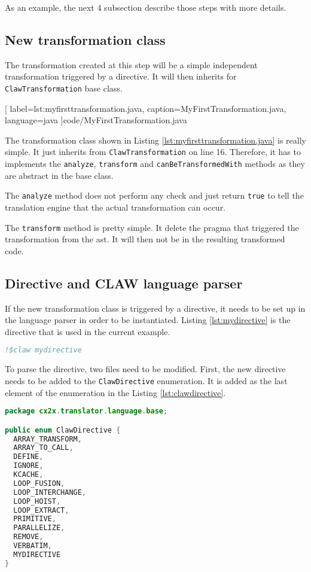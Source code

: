 As an example, the next 4 subsection describe those steps with more details.

\subsection{New transformation class}
The transformation created at this step will be a simple independent
transformation triggered by a directive. It will then inherits for
\lstinline|ClawTransformation| base class.


  [
    label=lst:myfirsttransformation.java,
    caption=MyFirstTransformation.java,
    language=java
  ]{code/MyFirstTransformation.java}

The transformation class shown in Listing \ref{lst:myfirsttransformation.java}
is really simple. It just inherits from \lstinline|ClawTransformation| on line
16. Therefore, it has to implements the \lstinline|analyze|,
\lstinline|transform| and \lstinline|canBeTransformedWith| methods as they are
abstract in the base class.

The \lstinline|analyze| method does not perform any check and just return
\lstinline|true| to tell the translation engine that the actual
transformation can occur.

The \lstinline|transform| method is pretty simple. It delete the pragma that
triggered the transformation from the \gls{ast}. It will then not be in the
resulting transformed code.

\subsection{Directive and CLAW language parser}
If the new transformation class is triggered by a directive, it needs to
be set up in the language parser in order to be instantiated. Listing
\ref{lst:mydirective} is the directive that is used in the current example.

\begin{lstlisting}[label=lst:mydirective, caption=Example directive, language=fortran]
!$claw mydirective
\end{lstlisting}

To parse the directive, two files need to be modified. First, the new directive
needs to be added to the \lstinline|ClawDirective| enumeration. It is added as
the last element of the enumeration in the Listing \ref{lst:clawdirective}.

\begin{lstlisting}[label=lst:clawdirective, caption=ClawDirective.java, language=java]
package cx2x.translator.language.base;

public enum ClawDirective {
  ARRAY_TRANSFORM,
  ARRAY_TO_CALL,
  DEFINE,
  IGNORE,
  KCACHE,
  LOOP_FUSION,
  LOOP_INTERCHANGE,
  LOOP_HOIST,
  LOOP_EXTRACT,
  PRIMITIVE,
  PARALLELIZE,
  REMOVE,
  VERBATIM,
  MYDIRECTIVE
}
\end{lstlisting}

